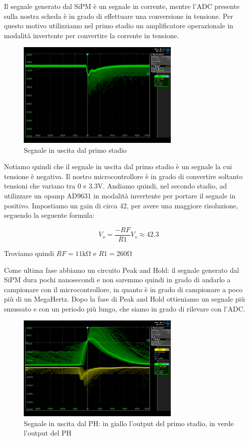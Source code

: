 Il segnale generato dal SiPM è un segnale in corrente, mentre l'ADC presente sulla nostra scheda è in grado di effettuare una conversione in tensione.
Per questo motivo utilizziamo nel primo stadio un amplificatore operazionale in modalità invertente per convertire la corrente in tensione.

\begin{figure}[H]
\centering
\includegraphics[width=0.7\textwidth]{assets/exp9/primo_stadio.png}
\caption{Segnale in uscita dal primo stadio}
\end{figure}

Notiamo quindi che il segnale in uscita dal primo stadio è un segnale la cui tensione è negativa.
Il nostro microcontrollore è in grado di convertire soltanto tensioni che variano tra 0 e 3.3V.
Andiamo quindi, nel secondo stadio, ad utilizzare un opamp AD9631 in modalità invertente per portare il segnale in positivo. Impostiamo un gain di circa 42, per avere una maggiore risoluzione, seguendo la seguente formula:

\begin{displaymath}
V_o = \frac{-RF}{R1} V_s \approx 42.3
\end{displaymath}

Troviamo quindi  $RF = 11 \si{\kilo\ohm}$ e $ R1 = 260 \si{\ohm}$

Come ultima fase abbiamo un circuito Peak and Hold: il segnale generato dal SiPM dura pochi nanosecondi e non saremmo quindi in grado di andarlo a campionare con il microcontrollore, in quanto è in grado di campionare a poco più di un MegaHertz. Dopo la fase di Peak and Hold ottieniamo un segnale più smussato e con un periodo più lungo, che siamo in grado di rilevare con l'ADC.

\begin{figure}[H]
\centering
\includegraphics[width=0.7\textwidth]{assets/exp9/inv_g_42.png}
\caption{Segnale in uscita dal PH: in giallo l'output del primo stadio, in verde l'output del PH}
\end{figure}

